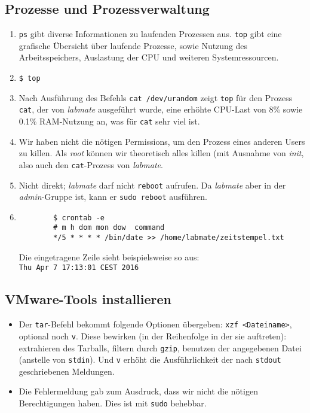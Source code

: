 \documentclass[12pt,a4paper]{article}
\begin{document}
\subsection{Prozesse und Prozessverwaltung}
\begin{enumerate}
    \item \texttt{ps} gibt diverse Informationen zu laufenden Prozessen aus. \texttt{top}
        gibt eine grafische Übersicht über laufende Prozesse, sowie Nutzung des
        Arbeitsspeichers, Auslastung der CPU und weiteren Systemressourcen.
    \item \texttt{\$ top} %
    \item Nach Ausführung des Befehls \texttt{cat /dev/urandom} zeigt \texttt{top} %
        für den Prozess \texttt{cat}, der von \textit{labmate} ausgeführt wurde, eine
        erhöhte CPU-Last von 8\% sowie 0.1\% RAM-Nutzung an, was für \texttt{cat} sehr
        viel ist.
    \item Wir haben nicht die nötigen Permissions, um den Prozess eines anderen Users zu
        killen. Als \textit{root} können wir theoretisch alles killen (mit Ausnahme
        von \textit{init}, also auch den \texttt{cat}-Prozess von \textit{labmate}.
    \item Nicht direkt; \textit{labmate} darf nicht \texttt{reboot} aufrufen. Da
        \textit{labmate} aber in der \textit{admin}-Gruppe ist, kann er
        \texttt{sudo reboot} ausführen.
    \item
        \begin{verbatim}
        $ crontab -e
        # m h dom mon dow  command
        */5 * * * * /bin/date >> /home/labmate/zeitstempel.txt
        \end{verbatim}
        Die eingetragene Zeile sieht beispielsweise so aus:\\ \texttt{Thu Apr  7 17:13:01 CEST 2016}
\end{enumerate}
\subsection{VMware-Tools installieren}
\begin{itemize}
    \item Der \texttt{tar}-Befehl bekommt folgende Optionen übergeben:
        \texttt{xzf <Dateiname>}, optional noch \texttt{v}. Diese bewirken
        (in der Reihenfolge in der sie auftreten): extrahieren des Tarballs,
        filtern durch \texttt{gzip}, benutzen der angegebenen Datei
        (anstelle von \texttt{stdin}). Und \texttt{v} erhöht die Ausführlichkeit
        der nach \texttt{stdout} geschriebenen Meldungen.
    \item Die Fehlermeldung gab zum Ausdruck, dass wir nicht die nötigen Berechtigungen
        haben. Dies ist mit \texttt{sudo} behebbar.
\end{itemize}
\end{document}
